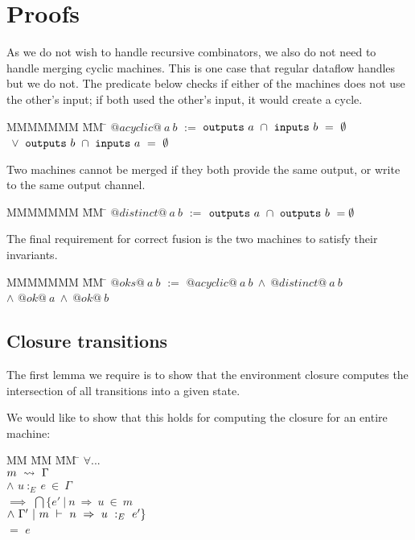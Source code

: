 \section{Proofs}
\label{s:Proofs}

As we do not wish to handle recursive combinators, we also do not need to handle merging cyclic machines.
This is one case that regular dataflow handles but we do not.
The predicate below checks if either of the machines does not use the other's input; if both used the other's input, it would create a cycle.

\begin{tabbing}
MMMMMMM \= MM \= \kill
$@acyclic@~a~b$
\> $:=$
\> $\mathtt{outputs}~a~\cap~\mathtt{inputs}~b~=~\emptyset$
\\
\> $~\vee$ \> $\mathtt{outputs}~b~\cap~\mathtt{inputs}~a~=~\emptyset$
\end{tabbing}

Two machines cannot be merged if they both provide the same output, or write to the same output channel.

\begin{tabbing}
MMMMMMM \= MM \= \kill
$@distinct@~a~b$
\> $:=$
\> $\mathtt{outputs}~a~\cap~\mathtt{outputs}~b~=\emptyset$
\end{tabbing}

The final requirement for correct fusion is the two machines to satisfy their invariants.
\begin{tabbing}
MMMMMMM \= MM \= \kill
$@oks@~a~b$
\> $:=$
\> $@acyclic@~a~b~\wedge~@distinct@~a~b$ \\
\> $\wedge$ \> $@ok@~a~\wedge~@ok@~b$ \\
\end{tabbing}

\subsection{Closure transitions}
The first lemma we require is to show that the environment closure computes the intersection of all transitions into a given state.

We would like to show that this holds for computing the closure for an entire machine:

\begin{tabbing}
MM \= MM \= MM \= \kill
$\forall...$ \\
\> \> $m ~\rightsquigarrow~ \Gamma$ \\
\> $\wedge$ \> $u~:_E~e~\in~\Gamma$ \\
\> $\implies$\> $\bigcap \{e'~|~n~\Rightarrow~u~\in~m$ \\
\>           \>         \> $\wedge~\Gamma' ~|~ m ~\vdash~ n~\Rightarrow~u ~:_E~ e' \}$ \\
\> $=$       \> $e$
\end{tabbing}

